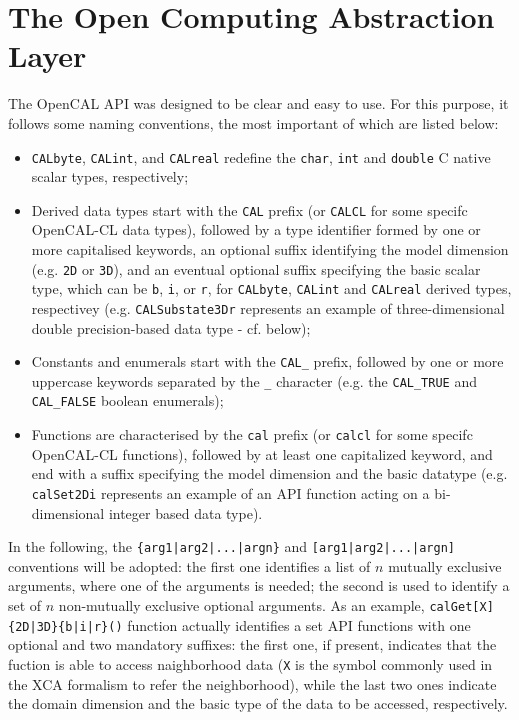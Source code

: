 \section{The Open Computing Abstraction Layer}
\label{sec:OpenCAL}
The OpenCAL API was designed to be clear and easy to use. For this
purpose, it follows some naming conventions, the most important of
which are listed below:
\begin{itemize}
	\item \verb'CALbyte', \verb'CALint', and \verb'CALreal' redefine
	the \verb'char', \verb'int' and \verb'double' C native scalar
	types, respectively;
	\item Derived data types start with the \verb'CAL' prefix (or
	\verb'CALCL' for some specifc OpenCAL-CL data types), followed
	by a type identifier formed by one or more capitalised keywords,
	an optional suffix identifying the model dimension
	(e.g. \verb'2D' or \verb'3D'), and an eventual optional suffix
	specifying the basic scalar type, which can be \verb'b',
	\verb'i', or \verb'r', for \verb'CALbyte', \verb'CALint' and
	\verb'CALreal' derived types, respectivey
	(e.g. \verb'CALSubstate3Dr' represents an example of
	three-dimensional double precision-based data type - cf. below);
	\item Constants and enumerals start with the \verb'CAL_' prefix,
	followed by one or more uppercase keywords separated by the
	\verb'_' character (e.g. the \verb'CAL_TRUE' and
	\verb'CAL_FALSE' boolean enumerals);
	\item Functions are characterised by the \verb'cal' prefix (or
	\verb'calcl' for some specifc OpenCAL-CL functions), followed by at
	least one capitalized keyword, and end with a suffix specifying
	the model dimension and the basic datatype
	(e.g. \verb'calSet2Di' represents an example of an API function
	acting on a bi-dimensional integer based data type).
\end{itemize}
In the following, the \verb'{arg1|arg2|...|argn}' and
\verb'[arg1|arg2|...|argn]' conventions will be adopted: the first
one identifies a list of $n$ mutually exclusive arguments, where one
of the arguments is needed; the second is used to identify a set of
$n$ non-mutually exclusive optional arguments. As an example,
\verb'calGet[X]{2D|3D}{b|i|r}()' function actually identifies a set
API functions with one optional and two mandatory suffixes: the
first one, if present, indicates that the fuction is able to access
naighborhood data (\verb'X' is the symbol commonly used in the XCA
formalism to refer the neighborhood), while the last two ones
indicate the domain dimension and the basic type of the data to be
accessed, respectively.

